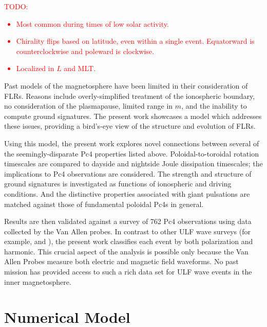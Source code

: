 \documentclass{article}
\newcommand{\todo}[1]{ \textcolor{red}{TODO: #1} }
\newcommand{\azm}{\ensuremath{m}\xspace}
\begin{document}
\todo{
\begin{itemize}
    \item Most common during times of low solar activity\cite{brekke_1987}.
    \item Chirality flips based on latitude, even within a single event\cite{eleman_1967}. Equatorward is counterclockwise and poleward is clockwise.
    \item Localized in $L$ and MLT\cite{anderson_1990}.
\end{itemize}
}

Past models of the magnetosphere have been limited in their consideration of FLRs. Reasons include overly-simplified treatment of the ionospheric boundary, no consideration of the plasmapause, limited range in \azm, and the inability to compute ground signatures. The present work showcases a model which addresses these issues, providing a bird’s-eye view of the structure and evolution of FLRs.

Using this model, the present work explores novel connections between several of the seemingly-disparate Pc4 properties listed above. Poloidal-to-toroidal rotation timescales are compared to dayside and nightside Joule dissipation timescales; the implications to Pc4 observations are considered. The strength and structure of ground signatures is investigated as functions of ionospheric and driving conditions. And the distinctive properties associated with giant pulsations are matched against those of fundamental poloidal Pc4s in general.

Results are then validated against a survey of 762 Pc4 observations using data collected by the Van Allen probes. In contrast to other ULF wave surveys (for example, \cite{dai_2015} and \cite{motoba_2015}), the present work classifies each event by both polarization and harmonic. This crucial aspect of the analysis is possible only because the Van Allen Probes measure both electric and magnetic field waveforms. No past mission has provided access to such a rich data set for ULF wave events in the inner magnetosphere.


\section{Numerical Model}
\end{document}
